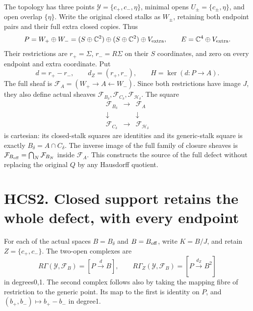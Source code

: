 The topology has three points \(\mathcal Y=\{c_+,c_-,\eta\}\), minimal
opens \(U_\pm=\{c_\pm,\eta\}\), and open overlap \(\{\eta\}\). Write the
original closed stalks as \(W_\pm\), retaining both endpoint pairs and
their full extra closed copies. Thus \[
P=W_+\oplus W_-=(S\oplus\mathbb C^2)\oplus
(S\oplus\mathbb C^2)\oplus V_{\rm extra},\qquad
E=\mathbb C^4\oplus V_{\rm extra}.
\] Their restrictions are \(r_+=\Sigma\), \(r_-=R\Sigma\) on their \(S\)
coordinates, and zero on every endpoint and extra coordinate. Put \[
d=r_+-r_-,\qquad d_Z=(r_+,r_-),\qquad H=\ker(d:P\to A).
\tag{HCS1.8}
\] The full sheaf is \(\mathcal F_A=(W_+\to A\leftarrow W_-)\). Since
both restrictions have image \(J\), they also define actual sheaves
\(\mathcal F_{B_\delta},\mathcal F_{C_\delta},
\mathcal F_{\mathcal H_\delta}\). The square \[
\begin{array}{ccc}
\mathcal F_{B_\delta}&\longrightarrow&\mathcal F_A\\
\downarrow&&\downarrow\\
\mathcal F_{C_\delta}&\longrightarrow&\mathcal F_{\mathcal H_\delta}
\end{array}
\tag{HCS1.9}
\] is cartesian: its closed-stalk squares are identities and its
generic-stalk square is exactly \(B_\delta=A\cap C_\delta\). The inverse
image of the full family of closure sheaves is
\(\mathcal F_{B_{\rm off}}=\bigcap_N\mathcal F_{B_N}\) inside
\(\mathcal F_A\). This constructs the source of the full defect without
replacing the original \(Q\) by any Hausdorff quotient.

\section{HCS2. Closed support retains the whole defect, with every
endpoint}\label{hcs2.-closed-support-retains-the-whole-defect-with-every-endpoint}

For each of the actual spaces \(B=B_\delta\) and \(B=B_{\rm off}\),
write \(K=B/J\), and retain \(Z=\{c_+,c_-\}\). The two-open complexes
are \[
R\Gamma(\mathcal Y,\mathcal F_B)=[P\xrightarrow d B],
\qquad
R\Gamma_Z(\mathcal Y,\mathcal F_B)
=[P\xrightarrow{d_Z}B^2]
\tag{HCS2.1}
\] in degrees0,1. The second complex follows also by taking the mapping
fibre of restriction to the generic point. Its map to the first is
identity on \(P\), and \((b_+,b_-)\mapsto b_+-b_-\) in degree1.

